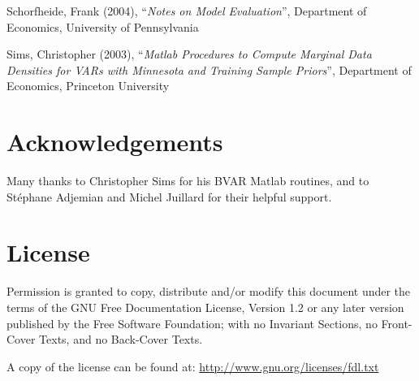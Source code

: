 \documentclass[10pt,a4paper]{article}
\begin{document}
Schorfheide, Frank (2004), ``\textit{Notes on Model Evaluation}'', Department of Economics, University of Pennsylvania

Sims, Christopher (2003), ``\textit{Matlab Procedures to Compute Marginal Data Densities for VARs with Minnesota and Training Sample Priors}'', Department of Economics, Princeton University

\section*{Acknowledgements}

Many thanks to Christopher Sims for his BVAR Matlab routines, and to St\'ephane Adjemian and Michel Juillard for their helpful support.

\section*{License}

Permission is granted to copy, distribute and/or modify this document under the terms of the GNU Free Documentation License, Version 1.2 or any later version published by the Free Software Foundation; with no Invariant Sections, no Front-Cover Texts, and no Back-Cover Texts.

A copy of the license can be found at:
\url{http://www.gnu.org/licenses/fdl.txt}
\end{document}
